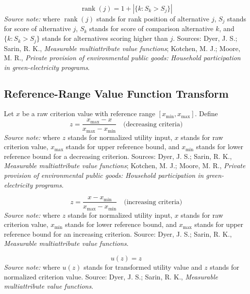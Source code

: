 \documentclass[12pt]{article}
\begin{document}
\begin{equation}
\label{eq:mavt_rank}
\operatorname{rank}(j) = 1 + \left|\{k: S_k > S_j\}\right|
\end{equation}
\noindent\textit{Source note:} where $\operatorname{rank}(j)$ stands for rank position of alternative $j$, $S_j$ stands for score of alternative $j$, $S_k$ stands for score of comparison alternative $k$, and $\{k: S_k > S_j\}$ stands for alternatives scoring higher than $j$. Sources: Dyer, J. S.; Sarin, R. K., \emph{Measurable multiattribute value functions}; Kotchen, M. J.; Moore, M. R., \emph{Private provision of environmental public goods: Household participation in green-electricity programs}.

\subsection{Reference-Range Value Function Transform}

Let $x$ be a raw criterion value with reference range $[x_{\min}, x_{\max}]$. Define
\begin{equation}
\label{eq:vf_normalize_dec}
z = \frac{x_{\max}-x}{x_{\max}-x_{\min}}\quad\text{(decreasing criteria)}
\end{equation}
\noindent\textit{Source note:} where $z$ stands for normalized utility input, $x$ stands for raw criterion value, $x_{\max}$ stands for upper reference bound, and $x_{\min}$ stands for lower reference bound for a decreasing criterion. Sources: Dyer, J. S.; Sarin, R. K., \emph{Measurable multiattribute value functions}; Kotchen, M. J.; Moore, M. R., \emph{Private provision of environmental public goods: Household participation in green-electricity programs}.

\begin{equation}
\label{eq:vf_normalize_inc}
z = \frac{x-x_{\min}}{x_{\max}-x_{\min}}\quad\text{(increasing criteria)}
\end{equation}
\noindent\textit{Source note:} where $z$ stands for normalized utility input, $x$ stands for raw criterion value, $x_{\min}$ stands for lower reference bound, and $x_{\max}$ stands for upper reference bound for an increasing criterion. Source: Dyer, J. S.; Sarin, R. K., \emph{Measurable multiattribute value functions}.

\begin{equation}
\label{eq:vf_linear}
u(z) = z
\end{equation}
\noindent\textit{Source note:} where $u(z)$ stands for transformed utility value and $z$ stands for normalized criterion value. Source: Dyer, J. S.; Sarin, R. K., \emph{Measurable multiattribute value functions}.
\end{document}
